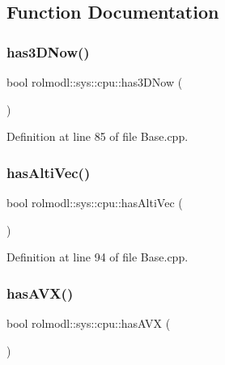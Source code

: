 \subsection{Function Documentation}
\mbox{\label{namespacerolmodl_1_1sys_1_1cpu_aff7e256df3cbeae474e4c64893544afb}} 
\subsubsection{\texorpdfstring{has3DNow()}{has3DNow()}}
{\footnotesize\ttfamily bool rolmodl\+::sys\+::cpu\+::has3\+D\+Now (\begin{DoxyParamCaption}{ }\end{DoxyParamCaption})\hspace{0.3cm}{\ttfamily [noexcept]}}



Definition at line 85 of file Base.\+cpp.

\mbox{\label{namespacerolmodl_1_1sys_1_1cpu_a314ab3cc20eb23538ccb57c4d0589beb}} 
\subsubsection{\texorpdfstring{hasAltiVec()}{hasAltiVec()}}
{\footnotesize\ttfamily bool rolmodl\+::sys\+::cpu\+::has\+Alti\+Vec (\begin{DoxyParamCaption}{ }\end{DoxyParamCaption})\hspace{0.3cm}{\ttfamily [noexcept]}}



Definition at line 94 of file Base.\+cpp.

\mbox{\label{namespacerolmodl_1_1sys_1_1cpu_a872c2351d54168bee9e7fbd649915546}} 
\subsubsection{\texorpdfstring{hasAVX()}{hasAVX()}}
{\footnotesize\ttfamily bool rolmodl\+::sys\+::cpu\+::has\+A\+VX (\begin{DoxyParamCaption}{ }\end{DoxyParamCaption})\hspace{0.3cm}{\ttfamily [noexcept]}}



